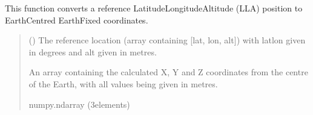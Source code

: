 \documentclass[letterpaper,10pt,english]{sphinxmanual}
\begin{document}

\begin{fulllineitems}
\label{\detokenize{modules/util/transformations:qnav.util.transformations.lla2ecef}}
\pysigstartsignatures
{}
\pysigstopsignatures
\sphinxAtStartPar
This function converts a reference Latitude\sphinxhyphen{}Longitude\sphinxhyphen{}Altitude (LLA)
position to Earth\sphinxhyphen{}Centred Earth\sphinxhyphen{}Fixed coordinates.
\begin{quote}\begin{description}
\sphinxAtStartPar
{} (\sphinxstyleliteralemphasis{\sphinxupquote{ (}}\sphinxstyleliteralemphasis{\sphinxupquote{)}}) \textendash{} The reference location (array containing {[}lat, lon, alt{]}) with
lat\sphinxhyphen{}lon given in degrees and alt given in metres.

\sphinxAtStartPar
An array containing the calculated X, Y and Z coordinates from
the centre of the Earth, with all values being given in metres.

\sphinxAtStartPar
numpy.ndarray (3\sphinxhyphen{}elements)

\end{description}\end{quote}

\end{fulllineitems}

\end{document}
